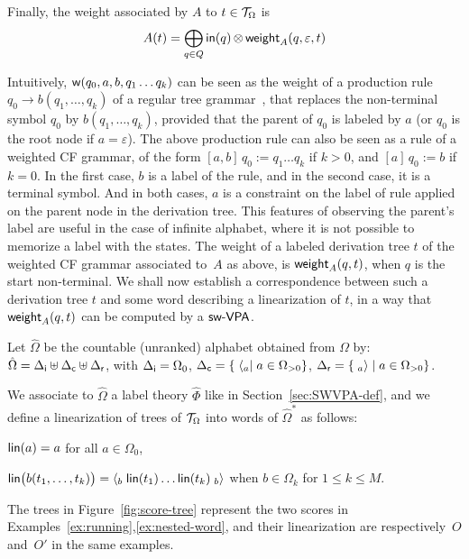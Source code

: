 \medskip\noindent
Finally, the weight associated by $A$ to  $t \in \mathcal{T}_\Omega$ is
\begin{equation}
A(t)  =
\displaystyle\bigoplus_{q \in Q} \mathsf{in}(q) \mathop{\otimes} \mathsf{weight}_A(q, \varepsilon, t)
\label{eq:weightTA}
\end{equation}

\noindent
Intuitively, $\mathsf{w}(q_0, a, b, q_1 \ldots q_k)$ can be seen as
the weight of a production rule $q_0 \to b(q_1, \ldots, q_k)$
of a regular tree grammar~\cite{tata},
that replaces the non-terminal symbol $q_0$ by $b(q_1, \ldots, q_k)$,
provided that the parent of $q_0$ is labeled by $a$
(or $q_0$ is the root node if $a = \varepsilon$).
%
The above production rule can also be seen as
a rule of a weighted CF grammar, of the form
$[a, b]\, q_0 := q_1 \ldots q_k$ if $k > 0$,
and $[a]\, q_0 := b$ if $k = 0$.
In the first case, $b$ is a label of the rule,
and in the second case, it is a terminal symbol.
And in both cases, $a$ is a constraint on the label of rule applied
on the parent node in the derivation tree.
This features of observing the parent's label
are useful in the case of infinite alphabet,
where it is not possible to memorize a label with the states.
%
\noindent The weight of a labeled derivation tree $t$
of the weighted CF grammar associated to~$A$ as above,
is $\mathsf{weight}_A(q, t)$,
when $q$ is the start non-terminal.
%
We shall now establish a correspondence between such a derivation tree $t$
and some word describing a linearization of $t$,
in a way that $\mathsf{weight}_A(q, t)$ can be computed by a $\textsf{sw-VPA}$.

Let $\hat\Omega$ be the countable (unranked) alphabet obtained
from $\Omega$ by:
$\hat\Omega = {\Delta_\mathsf{i}} \uplus {\Delta_\mathsf{c}} \uplus {\Delta_\mathsf{r}}$, with
${\Delta_\mathsf{i}} = \Omega_0$,
${\Delta_\mathsf{c}} = \{ \; \langle_{a} \mid a \in \Omega_{>0} \}$,
${\Delta_\mathsf{r}} = \{ \; _{a}{\rangle} \mid a \in \Omega_{>0} \}$.

\noindent
We associate to $\hat\Omega$
a label theory $\hat{\Phi}$
like in Section~\ref{sec:SWVPA-def},
%
\noindent
and we define a linearization of trees of $\mathcal{T}_\Omega$ into
words of ${\hat\Omega}^*$ as follows:
\begin{description}
\item $\mathsf{lin}(a) = a$ for all $a \in \Omega_0$,
\item $\mathsf{lin}\bigl( b(t_1, \ldots, t_k)\bigr) =
       \langle_{b} \; \mathsf{lin}(t_1) \ldots \mathsf{lin}(t_k) \; _{b}{\rangle}$
       when $b \in \Omega_k$ for $1 \leq k \leq M$.
\end{description}
%
\begin{example}
The trees in Figure~\ref{fig:score-tree}
represent the two scores in Examples~\ref{ex:running},\ref{ex:nested-word}, 
and their linearization are respectively~$O$ and~$O'$ in the same examples.
\end{example}


